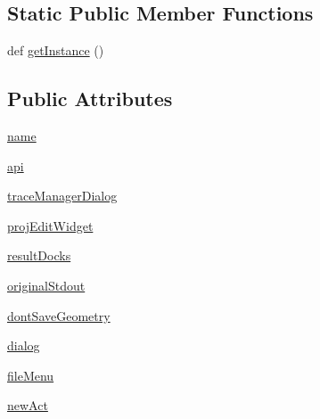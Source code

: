 \subsection*{Static Public Member Functions}
\begin{DoxyCompactItemize}
\item 
def \hyperlink{classsoftware_1_1chipwhisperer_1_1common_1_1ui_1_1CWMainGUI_1_1CWMainGUI_a0d0be4a421b37ec7e328ff03232c1845}{get\+Instance} ()
\end{DoxyCompactItemize}
\subsection*{Public Attributes}
\begin{DoxyCompactItemize}
\item 
\hyperlink{classsoftware_1_1chipwhisperer_1_1common_1_1ui_1_1CWMainGUI_1_1CWMainGUI_a143ef09d088e7ef74ee8e681e3ed69c1}{name}
\item 
\hyperlink{classsoftware_1_1chipwhisperer_1_1common_1_1ui_1_1CWMainGUI_1_1CWMainGUI_aa5ab4796edad68755b7a4604bd3d510e}{api}
\item 
\hyperlink{classsoftware_1_1chipwhisperer_1_1common_1_1ui_1_1CWMainGUI_1_1CWMainGUI_af0baf374329a3ad2e369d6f3c4e86677}{trace\+Manager\+Dialog}
\item 
\hyperlink{classsoftware_1_1chipwhisperer_1_1common_1_1ui_1_1CWMainGUI_1_1CWMainGUI_a5a060162964cbe4b9ad665dd43529edc}{proj\+Edit\+Widget}
\item 
\hyperlink{classsoftware_1_1chipwhisperer_1_1common_1_1ui_1_1CWMainGUI_1_1CWMainGUI_ac29b85f445893cf5a531d4d65457941f}{result\+Docks}
\item 
\hyperlink{classsoftware_1_1chipwhisperer_1_1common_1_1ui_1_1CWMainGUI_1_1CWMainGUI_ae5c45417a25ce9082c5df82f352858f8}{original\+Stdout}
\item 
\hyperlink{classsoftware_1_1chipwhisperer_1_1common_1_1ui_1_1CWMainGUI_1_1CWMainGUI_a02ea94a0c80f51d8e032cd74251f29e8}{dont\+Save\+Geometry}
\item 
\hyperlink{classsoftware_1_1chipwhisperer_1_1common_1_1ui_1_1CWMainGUI_1_1CWMainGUI_a0437ce80464c8a4446ae29e16cf14cfe}{dialog}
\item 
\hyperlink{classsoftware_1_1chipwhisperer_1_1common_1_1ui_1_1CWMainGUI_1_1CWMainGUI_a534415869a2001be6b988f3992b81779}{file\+Menu}
\item 
\hyperlink{classsoftware_1_1chipwhisperer_1_1common_1_1ui_1_1CWMainGUI_1_1CWMainGUI_a1070313d0a12169cb81d6993cb972155}{new\+Act}
\item 

\end{DoxyCompactItemize}
